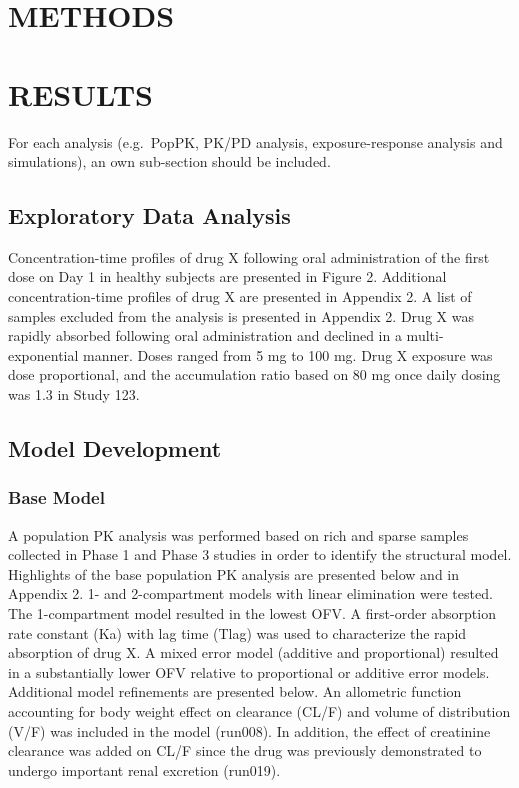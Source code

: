 \documentclass[
  letterpaper,
  toc=chapterentrywithdots,
  11pt,
  headings=small]{scrreprt}
\begin{document}

\chapter{METHODS}\label{sec-methods}


\chapter{RESULTS}\label{sec-results}

For each analysis (e.g.~PopPK, PK/PD analysis, exposure-response
analysis and simulations), an own sub-section should be included.

\section{Exploratory Data Analysis}\label{exploratory-data-analysis-1}

Concentration-time profiles of drug X following oral administration of
the first dose on Day 1 in healthy subjects are presented in Figure 2.
Additional concentration-time profiles of drug X are presented in
Appendix 2. A list of samples excluded from the analysis is presented in
Appendix 2. Drug X was rapidly absorbed following oral administration
and declined in a multi-exponential manner. Doses ranged from 5 mg to
100 mg. Drug X exposure was dose proportional, and the accumulation
ratio based on 80 mg once daily dosing was 1.3 in Study 123.

\section{Model Development}\label{model-development}

\subsection{Base Model}\label{base-model}

A population PK analysis was performed based on rich and sparse samples
collected in Phase 1 and Phase 3 studies in order to identify the
structural model. Highlights of the base population PK analysis are
presented below and in Appendix 2. 1- and 2-compartment models with
linear elimination were tested. The 1-compartment model resulted in the
lowest OFV. A first-order absorption rate constant (Ka) with lag time
(Tlag) was used to characterize the rapid absorption of drug X. A mixed
error model (additive and proportional) resulted in a substantially
lower OFV relative to proportional or additive error models. Additional
model refinements are presented below. An allometric function accounting
for body weight effect on clearance (CL/F) and volume of distribution
(V/F) was included in the model (run008). In addition, the effect of
creatinine clearance was added on CL/F since the drug was previously
demonstrated to undergo important renal excretion (run019).
\end{document}
